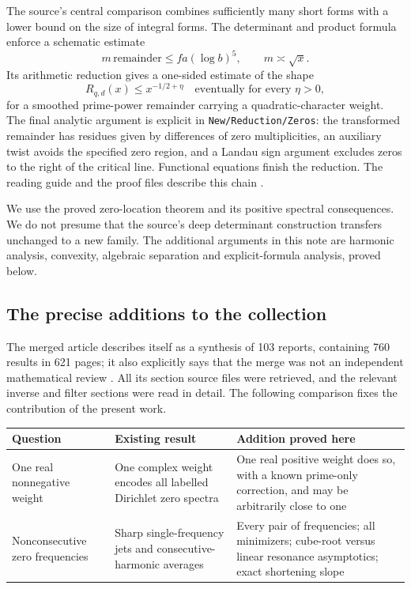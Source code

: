 The source's central comparison combines sufficiently many short forms
with a lower bound on the size of integral forms. The determinant and
product formula enforce a schematic estimate
\[
 m\,\mathrm{remainder}\le f a(\log b)^5,
 \qquad m\asymp\sqrt{x}.
\]
Its arithmetic reduction gives a one-sided estimate of the shape
\[
 R_{q,d}(x)\le x^{-1/2+\eta}\quad\text{eventually for every }\eta>0,
\]
for a smoothed prime-power remainder carrying a quadratic-character
weight. The final analytic argument is explicit in
\texttt{New/Reduction/Zeros}: the transformed remainder has residues
given by differences of zero multiplicities, an auxiliary twist avoids
the specified zero region, and a Landau sign argument excludes zeros to
the right of the critical line. Functional equations finish the reduction.
The reading guide and the proof files describe this chain
\cite{GRHLean}.

We use the proved zero-location theorem and its positive spectral
consequences. We do not presume that the source's deep determinant
construction transfers unchanged to a new family. The additional
arguments in this note are harmonic analysis, convexity, algebraic
separation and explicit-formula analysis, proved below.

\subsection{The precise additions to the collection}

The merged article describes itself as a synthesis of 103 reports,
containing 760 results in 621 pages; it also explicitly says that the
merge was not an independent mathematical review \cite{ProveItArticle}.
All its section source files were retrieved, and the relevant inverse
and filter sections were read in detail. The following comparison fixes
the contribution of the present work.

\begin{center}
\small
\begin{tabular}{@{}p{.30\linewidth}p{.31\linewidth}p{.31\linewidth}@{}}
\toprule
Question & Existing result & Addition proved here\\
\midrule
One real nonnegative weight & One complex weight encodes all labelled
Dirichlet zero spectra & One real positive weight does so, with a known
prime-only correction, and may be arbitrarily close to one\\[4pt]
Nonconsecutive zero frequencies & Sharp single-frequency jets and
consecutive-harmonic averages & Every pair of frequencies; all
minimizers; cube-root versus linear resonance asymptotics; exact
shortening slope\\
\bottomrule
\end{tabular}
\end{center}

